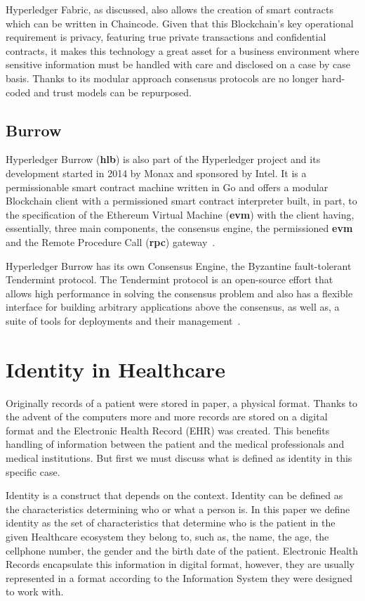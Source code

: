Hyperledger Fabric, as discussed, also allows the creation of smart contracts
which can be written in Chaincode.  Given that this Blockchain's key
operational requirement is privacy, featuring true private transactions and
confidential contracts, it makes this technology a great asset for a business
environment where sensitive information must be handled with care and
disclosed on a case by case basis.  Thanks to its modular approach consensus
protocols are no longer hard-coded and trust models can be repurposed.

\subsection{Burrow}

Hyperledger Burrow (\textbf{hlb}) is also part of the Hyperledger project and
its development started in 2014 by Monax and sponsored by Intel. It is a
permissionable smart contract machine written in Go and offers a modular
Blockchain client with a permissioned smart contract interpreter built, in
part, to the specification of the Ethereum Virtual Machine (\textbf{evm})
with the client having, essentially, three main components, the consensus
engine, the permissioned \textbf{evm} and the Remote Procedure Call
(\textbf{rpc}) gateway~\cite{Kuhlman2017,HyperledgerBurrow2017}.

Hyperledger Burrow has its own Consensus Engine, the Byzantine fault-tolerant
Tendermint protocol.  The Tendermint protocol is an open-source effort that
allows high performance in solving the consensus problem and also has a
flexible interface for building arbitrary applications above the consensus,
as well as, a suite of tools for deployments and their
management~\cite{Buchman2016}.

\section{Identity in Healthcare}

Originally records of a patient were stored in paper, a physical format.
Thanks to the advent of the computers more and more records are stored on a
digital format and the Electronic Health Record (EHR) was created.
\cite{Marquez2017}  This benefits handling of information between the patient
and the medical professionals and medical
institutions.\cite{ONCoordinator2017} But first we must discuss what is
defined as identity in this specific case.

Identity is a construct that depends on the context.  Identity can be defined
as the characteristics determining who or what a person is.  In this paper we
define identity as the set of characteristics that determine who is the
patient in the given Healthcare ecosystem they belong to, such as, the name,
the age, the cellphone number, the gender and the birth date of the patient.
Electronic Health Records encapsulate this information in digital format,
however, they are usually represented in a format according to the
Information System they were designed to work with.

